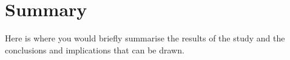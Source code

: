 \documentclass[12pt]{article}
\begin{document}
\section{Summary}

Here is where you would briefly summarise the results of the study and the conclusions and implications that can be drawn.



\end{document}
